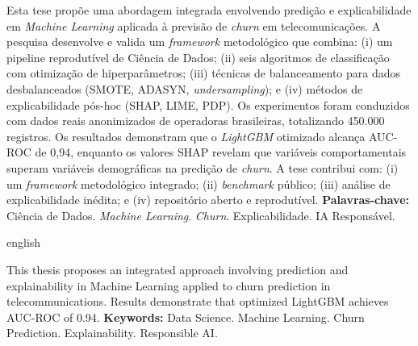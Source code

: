 \documentclass[
    12pt,
    oneside,
    a4paper,
    english,
    brazilian
    ]{abntex2}
\numberwithin{equation}{chapter}
\begin{document}
\pretextual
\maketitle
\newpage

\begin{resumo}
\noindent Esta tese propõe uma abordagem integrada envolvendo predição e explicabilidade em \textit{Machine Learning} aplicada à previsão de \textit{churn} em telecomunicações. A pesquisa desenvolve e valida um \textit{framework} metodológico que combina: (i) um pipeline reprodutível de Ciência de Dados; (ii) seis algoritmos de classificação com otimização de hiperparâmetros; (iii) técnicas de balanceamento para dados desbalanceados (SMOTE, ADASYN, \textit{undersampling}); e (iv) métodos de explicabilidade pós-hoc (SHAP, LIME, PDP). Os experimentos foram conduzidos com dados reais anonimizados de operadoras brasileiras, totalizando 450.000 registros. Os resultados demonstram que o \textit{LightGBM} otimizado alcança AUC-ROC de 0,94, enquanto os valores SHAP revelam que variáveis comportamentais superam variáveis demográficas na predição de \textit{churn}. A tese contribui com: (i) um \textit{framework} metodológico integrado; (ii) \textit{benchmark} público; (iii) análise de explicabilidade inédita; e (iv) repositório aberto e reprodutível.
\noindent \textbf{Palavras-chave:} Ciência de Dados. \textit{Machine Learning}. \textit{Churn}. Explicabilidade. IA Responsável.
\end{resumo}

\begin{otherlanguage*}{english}
\begin{resumo}[Abstract]
\noindent This thesis proposes an integrated approach involving prediction and explainability in Machine Learning applied to churn prediction in telecommunications. Results demonstrate that optimized LightGBM achieves AUC-ROC of 0.94.
\noindent \textbf{Keywords:} Data Science. Machine Learning. Churn Prediction. Explainability. Responsible AI.
\end{resumo}
\end{otherlanguage*}
\newpage

\listoffigures*
\newpage
{}
\listoftables*
\newpage

\textual
\end{document}
